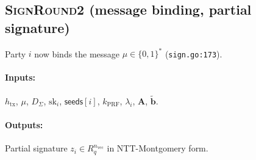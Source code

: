 \subsection{\textsc{SignRound2} (message binding, partial signature)}
\label{sec:protocol:round2}

Party $i$ now binds the message $\mu \in \{0,1\}^*$ (\texttt{sign.go:173}).

\paragraph{Inputs:} $h_{\mathrm{tx}}$, $\mu$, $D_\Sigma$,
$\mathrm{sk}_i$, $\mathsf{seeds}[i]$, $k_{\mathrm{PRF}}$, $\lambda_i$,
$\mathbf{A}$, $\tilde{\mathbf{b}}$.

\paragraph{Outputs:} Partial signature $z_i \in R_q^{n_{\mathrm{vec}}}$
in NTT-Montgomery form.


